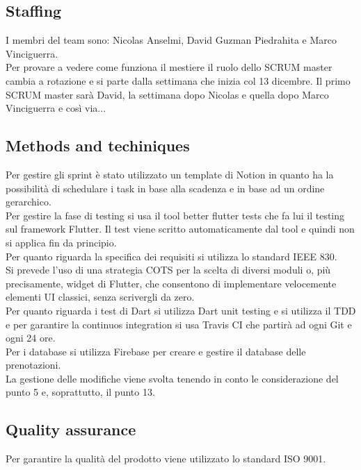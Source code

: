 \documentclass{article}
\begin{document}
\subsection{Staffing}
I membri del team sono: Nicolas Anselmi, David Guzman Piedrahita e Marco Vinciguerra.
\\Per provare a vedere come funziona il mestiere il ruolo dello SCRUM master cambia a rotazione e si parte dalla settimana 
che inizia col 13 dicembre. Il primo SCRUM master sarà David, la settimana dopo Nicolas e quella dopo Marco Vinciguerra e così via...

\subsection{Methods and techiniques}
Per gestire gli sprint è stato utilizzato un template di Notion in quanto ha la possibilità di schedulare i task in base alla scadenza e in base ad un ordine gerarchico.
\\Per gestire la fase di testing si usa il tool better flutter tests che fa lui il testing sul framework Flutter. Il test viene scritto automaticamente dal tool e quindi 
non si applica fin da principio.
\\Per quanto riguarda la specifica dei requisiti si utilizza lo standard IEEE 830.
\\Si prevede l'uso di una strategia COTS per la scelta di diversi moduli o, più precisamente, widget di Flutter, che consentono di implementare velocemente
elementi UI classici, senza scrivergli da zero.
\\Per quanto riguarda i test di Dart si utilizza Dart unit testing e si utilizza il TDD e per garantire la continuos integration si usa Travis CI che partirà ad ogni 
Git e ogni 24 ore.
\\Per i database si utilizza Firebase  per creare e gestire il database delle prenotazioni.
\\La gestione delle modifiche viene svolta tenendo in conto le considerazione del punto 5 e, soprattutto, il punto 13.
\subsection{Quality assurance}
Per garantire la qualità del prodotto viene utilizzato lo standard ISO 9001.
\end{document}
